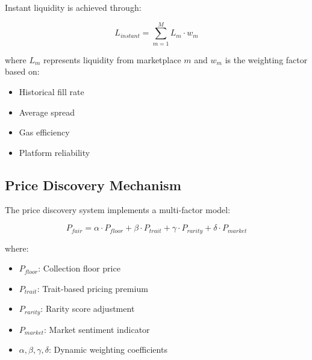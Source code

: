 Instant liquidity is achieved through:

\begin{equation}
L_{instant} = \sum_{m=1}^{M} L_m \cdot w_m
\end{equation}

where $L_m$ represents liquidity from marketplace $m$ and $w_m$ is the weighting factor based on:
\begin{itemize}
\item Historical fill rate
\item Average spread
\item Gas efficiency
\item Platform reliability
\end{itemize}

\subsection{Price Discovery Mechanism}

The price discovery system implements a multi-factor model:

\begin{equation}
P_{fair} = \alpha \cdot P_{floor} + \beta \cdot P_{trait} + \gamma \cdot P_{rarity} + \delta \cdot P_{market}
\end{equation}

where:
\begin{itemize}
\item $P_{floor}$: Collection floor price
\item $P_{trait}$: Trait-based pricing premium
\item $P_{rarity}$: Rarity score adjustment
\item $P_{market}$: Market sentiment indicator
\item $\alpha, \beta, \gamma, \delta$: Dynamic weighting coefficients
\end{itemize}


